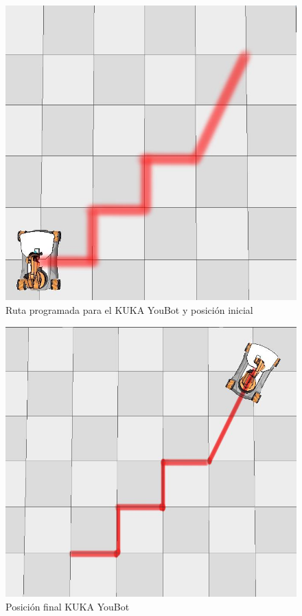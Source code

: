 \documentclass[conference]{IEEEtran}
\begin{document}
  \begin{figure}
    \includegraphics[width=\linewidth]{figures/kuka_init_pos.jpg}
    \caption{Ruta programada para el KUKA YouBot y posición inicial}
    \label{fig:kukaroute}
  \end{figure}

  \begin{figure}
    \includegraphics[width=\linewidth]{figures/kuka_final_pos.jpg}
    \caption{Posición final KUKA YouBot}
    \label{fig:kukafinal}
  \end{figure}
\end{document}
